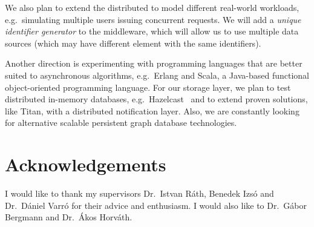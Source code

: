 We also plan to extend the distributed \tb{} to model different real-world workloads, e.g.\ simulating multiple users issuing concurrent requests. We will add a \emph{unique identifier generator} to the middleware, which will allow us to use multiple data sources (which may have different element with the same identifiers).   

Another direction is experimenting with programming languages that are better suited to asynchronous algorithms, e.g.\ Erlang and Scala, a Java-based functional object-oriented programming language.
For our storage layer, we plan to test distributed in-memory databases, e.g.\ Hazelcast~\cite{Hazelcast} and to extend proven solutions, like Titan, with a distributed notification layer.
Also, we are constantly looking for alternative scalable persistent graph database technologies. 

\section{Acknowledgements}

I would like to thank my supervisors Dr.~Istvan Ráth, Benedek Izsó and Dr.~Dániel Varró for their advice and enthusiasm. I would also like to Dr.~Gábor Bergmann and Dr.~Ákos Horváth.
